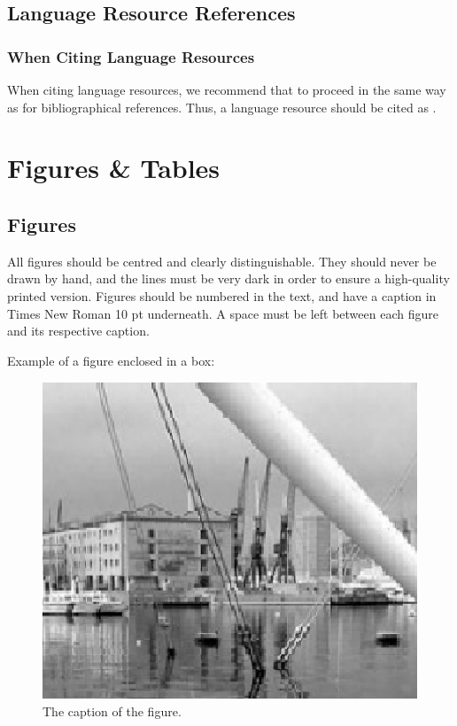 \documentclass[10pt, a4paper]{article}
\begin{document}
\subsection{Language Resource References}

\subsubsection{When Citing Language Resources}

When citing language resources, we recommend that to proceed in the same way as for bibliographical references.
Thus, a language resource should be cited as .

\section{Figures \& Tables}
\subsection{Figures}

All figures should be centred and clearly distinguishable. They should never be
drawn by hand, and the lines must be very dark in order to ensure a high-quality
printed version. Figures should be numbered in the text, and have a caption in
Times New Roman 10 pt underneath. A space must be left between each figure and
its respective caption.

Example of a figure enclosed in a box:

\begin{figure}[!h]
\begin{center}
\includegraphics[scale=0.5]{lrec2020W-image1.eps}
\caption{The caption of the figure.}
\label{fig.1}
\end{center}
\end{figure}
\end{document}
